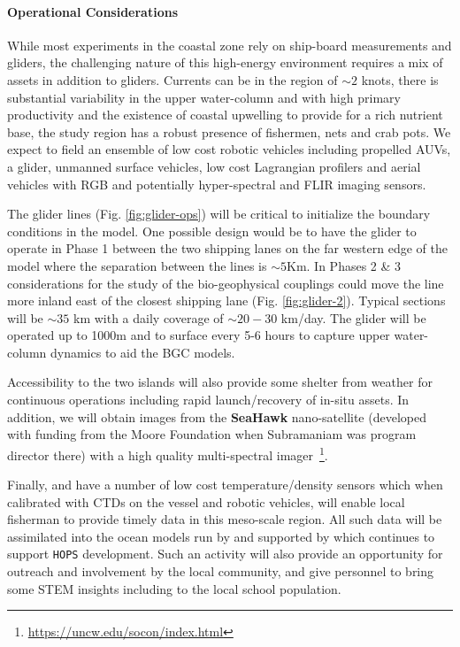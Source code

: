 \paragraph{Operational Considerations} While most experiments in the
coastal zone rely on ship-board measurements and gliders, the
challenging nature of this high-energy environment requires a mix of
assets in addition to gliders. Currents can be in the region of
$\sim 2$ knots, there is substantial variability in the upper
water-column and with high primary productivity and the existence of
coastal upwelling to provide for a rich nutrient base, the study
region has a robust presence of fishermen, nets and crab pots. We
expect to field an ensemble of low cost robotic vehicles including
propelled AUVs, a glider, unmanned surface vehicles, low cost
Lagrangian profilers and aerial vehicles with RGB and potentially
hyper-spectral and FLIR imaging sensors.

The glider lines (Fig. \ref{fig:glider-ops}) will be critical to
initialize the boundary conditions in the model. One possible design
would be to have the glider to operate in Phase 1 between the two
shipping lanes on the far western edge of the model where the
separation between the lines is $\sim 5$Km. In Phases 2 \& 3
considerations for the study of the bio-geophysical couplings could
move the line more inland east of the closest shipping lane
(Fig. \ref{fig:glider-2}). Typical sections will be $\sim 35$ km with
a daily coverage of $\sim 20-30$ km/day. The glider will be operated
up to 1000m and to surface every 5-6 hours to capture upper
water-column dynamics to aid the BGC models.

Accessibility to the two islands will also provide some shelter from
weather for continuous operations including rapid launch/recovery of
in-situ assets. In addition, we will obtain images from the
\textbf{SeaHawk} nano-satellite (developed with funding from the Moore
Foundation when Subramaniam was program director there) with a high
quality multi-spectral
imager~\footnote{\url{https://uncw.edu/socon/index.html}}.

Finally, \univ and \inst have a number of low cost temperature/density
sensors which when calibrated with CTDs on the vessel and robotic
vehicles, will enable local fisherman to provide timely data in this
meso-scale region. All such data will be assimilated into the ocean
models run by \inst and supported by \mit which continues to support
\texttt{HOPS} development. Such an activity will also provide an
opportunity for outreach and involvement by the local community, and
give \proj personnel to bring some STEM insights including to the
local school population. 

